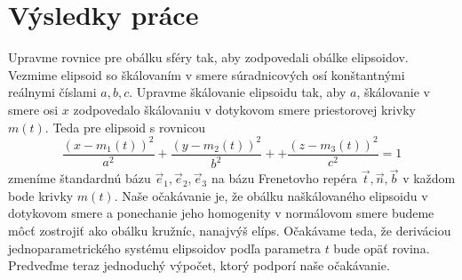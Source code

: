 \chapter{Výsledky práce}
Upravme rovnice pre obálku sféry tak, aby zodpovedali obálke elipsoidov. Vezmime elipsoid so škálovaním v smere súradnicových osí konštantnými reálnymi číslami $a,b,c.$ Upravme škálovanie elipsoidu tak, aby $a$, škálovanie v smere osi $x$ zodpovedalo škálovaniu v dotykovom smere priestorovej krivky $m(t).$
Teda pre elipsoid s rovnicou
\begin{equation}
\frac{{(x - m_1(t))^2}}{{a^2}} + \frac{{(y - m_2(t))^2}}{{b^2}} + + \frac{{(z - m_3(t))^2}}{{c^2}}= 1
\end{equation} 
zmeníme štandardnú bázu $\vec{e}_1, \vec{e}_2, \vec{e}_3$ na bázu Frenetovho repéra $\vec{t}, \vec{n}, \vec{b}$ v každom bode krivky $m(t).$ Naše očakávanie je, že obálku naškálovaného elipsoidu v dotykovom smere a ponechanie jeho homogenity v normálovom smere budeme môcť zostrojiť ako obálku kružníc, nanajvýš elíps. Očakávame teda, že deriváciou jednoparametrického systému elipsoidov podľa parametra $t$ bude opäť rovina. Predveďme teraz jednoduchý výpočet, ktorý podporí naše očakávanie.
